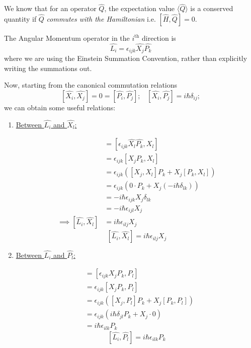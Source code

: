 \documentclass{article}
\newcommand{\mean}[1]{\langle #1 \rangle}
\begin{document}
\vskip 0.5cm
We know that for an operator $\hat{Q}$, the expectation value $\mean{\hat{Q}}$ is a conserved quantity if $\hat{Q}$ \emph{commutes with the Hamiltonian} i.e. $[\hat{H}, \hat{Q}] = 0$.

\vskip 0.5cm
The Angular Momentum operator in the $i^{\text{th}}$ direction is \[ \hat{L_i} = \epsilon_{ijk} \hat{X_j} \hat{P_k} \]
where we are using the Einstein Summation Convention, rather than explicitly writing the summations out.

\vskip 0.5cm
Now, starting from the canonical commutation relations
\[ [\hat{X_i}, \hat{X_j}] = 0 = [\hat{P_i}, \hat{P_j}];\;\;\;[\hat{X_i}, \hat{P_j}] = i\hbar\delta_{ij}; \] we can obtain some useful relations:

\begin{enumerate}
  \item \underline{Between $\hat{L_i}$ and $\hat{X_l}$:}
  
  \begin{align*}
    [\hat{L_i}, \hat{X_l}] &= [\epsilon_{ijk} \hat{X_l} \hat{P_k}, X_l] \\
    &= \epsilon_{ijk} [X_j P_k, X_l] \\
    &= \epsilon_{ijk} \left( [X_j, X_l]P_k + X_j[P_k, X_l] \right) \\
    &=\epsilon_{ijk} \left( 0 \cdot P_k + X_j(-i\hbar\delta_{lk}) \right) \\
    &= -i\hbar\epsilon_{ijk}  X_j\delta_{lk} \\
    &= -i\hbar\epsilon_{ijl} X_j \\
    \implies [\hat{L_i}, \hat{X_l}] &= i\hbar\epsilon_{ilj} X_j
  \end{align*}
  \[ \boxed{[\hat{L_i}, \hat{X_l}] = i\hbar\epsilon_{ilj} X_j } \]

  \item \underline{Between $\hat{L_i}$ and $\hat{P_l}$:}
  
  \begin{align*}
    [\hat{L_i}, \hat{P_l}] &= [\epsilon_{ijk} X_j P_k, P_l] \\
    &= \epsilon_{ijk} [X_j P_k, P_l] \\
    &= \epsilon_{ijk} \left( [X_j, P_l]P_k + X_j[P_k, P_l] \right) \\
    &= \epsilon_{ijk} \left( i \hbar \delta_{jl} P_k +X_j \cdot 0 \right) \\
    &= i \hbar \epsilon_{ilk} P_k
  \end{align*}
  \[ \boxed{[\hat{L_i}, \hat{P_l}] =  i \hbar \epsilon_{ilk} P_k} \]


\end{enumerate}
\end{document}
